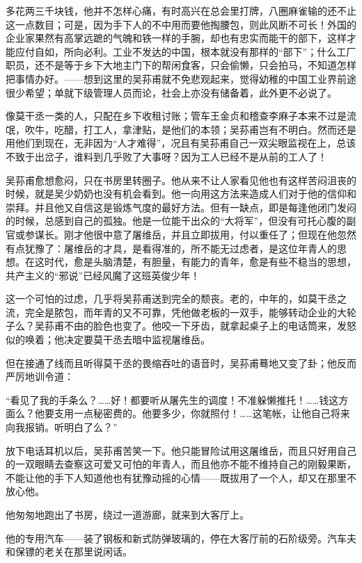 \par 多花两三千块钱，他并不怎样心痛，有时高兴在总会里打牌，八圈麻雀输的还不止这一点数目；可是，因为手下人的不中用而要他掏腰包，则此风断不可长！外国的企业家果然有高掌远蹠的气魄和铁一样的手腕，却也有忠实而能干的部下，这样才能应付自如，所向必利。工业不发达的中国，根本就没有那样的“部下”；什么工厂职员，还不是等于乡下大地主门下的帮闲食客，只会偷懒，只会拍马，不知道怎样把事情办好。——想到这里的吴荪甫就不免悲观起来，觉得幼稚的中国工业界前途很少希望；单就下级管理人员而论，社会上亦没有储备着，此外更不必说了。
\par 像莫干丞一类的人，只配在乡下收租讨账；管车王金贞和稽查李麻子本来不过是流氓，吹牛，吃醋，打工人，拿津贴，是他们的本领；吴荪甫岂有不明白。然而还是用他们到现在，无非因为“人才难得”，况且有吴荪甫自己一双尖眼监视在上，总该不致于出岔子，谁料到几乎败了大事呀？因为工人已经不是从前的工人了！
\par 吴荪甫愈想愈闷，只在书房里转圈子。他从来不让人家看见他也有这样苦闷沮丧的时候，就是吴少奶奶也没有机会看到。他一向用这方法来造成人们对于他的信仰和崇拜。并且他又自信这是锻炼气度的最好方法。但有一缺点，即是每逢他闭门发闷的时候，总感到自己的孤独。他是一位能干出众的“大将军”，但没有可托心腹的副官或参谋长。刚才他很中意了屠维岳，并且立即拔用，付以重任了；但现在他忽然有点犹豫了：屠维岳的才具，是看得准的，所不能无过虑者，是这位年青人的思想。在这时代，愈是头脑清楚，有胆量，有能力的青年，愈是有些不稳当的思想，共产主义的“邪说”已经风魔了这班英俊少年！
\par 这一个可怕的过虑，几乎将吴荪甫送到完全的颓丧。老的，中年的，如莫干丞之流，完全是脓包，而年青的又不可靠，凭他做老板的一双手，能够转动企业的大轮子么？吴荪甫不由的脸色也变了。他咬一下牙齿，就拿起桌子上的电话筒来，发怒似的唤着；他决定要莫干丞去暗中监视屠维岳。
\par 但在接通了线而且听得莫干丞的畏缩吞吐的语音时，吴荪甫蓦地又变了卦；他反而严厉地训令道：
\par “看见了我的手条么？……好！都要听从屠先生的调度！不准躲懒推托！……钱这方面么？他要支用一点秘密费的。他要多少，你就照付！……这笔帐，让他自己将来向我报销。听明白了么？”
\par 放下电话耳机以后，吴荪甫苦笑一下。他只能冒险试用这屠维岳，而且只好用自己的一双眼睛去查察这可爱又可怕的年青人，而且他亦不能不维持自己的刚毅果断，不能让他的手下人知道他也有犹豫动摇的心情——既拔用了一个人，却又在那里不放心他。
\par 他匆匆地跑出了书房，绕过一道游廊，就来到大客厅上。
\par 他的专用汽车——装了钢板和新式防弹玻璃的，停在大客厅前的石阶级旁。汽车夫和保镖的老关在那里说闲话。
